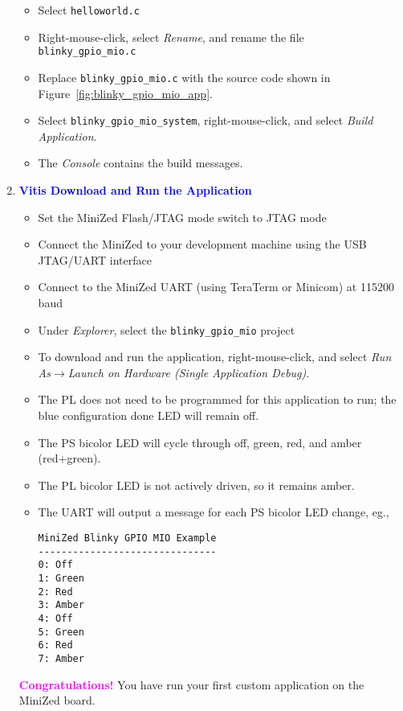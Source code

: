 \begin{enumerate}
\begin{itemize}
\item Select \texttt{helloworld.c}
\item Right-mouse-click, select \emph{Rename}, and rename the file \texttt{blinky\_gpio\_mio.c}
\item Replace \texttt{blinky\_gpio\_mio.c} with the source code shown in
Figure~\ref{fig:blinky_gpio_mio_app}.
\item Select \texttt{blinky\_gpio\_mio\_system}, right-mouse-click, and
select \emph{Build Application}.
\item The \emph{Console} contains the build messages.
\end{itemize}
%
\item \textcolor{blue}{\textbf{Vitis Download and Run the Application}}
%
\begin{itemize}
\item Set the MiniZed Flash/JTAG mode switch to JTAG mode
\item Connect the MiniZed to your development machine using the USB JTAG/UART interface
\item Connect to the MiniZed UART (using TeraTerm or Minicom) at 115200 baud
\item Under \emph{Explorer}, select the \texttt{blinky\_gpio\_mio}
project
\item To download and run the application, right-mouse-click, and 
select \emph{Run As}$\rightarrow$\emph{Launch on Hardware 
(Single Application Debug)}.
\item The PL does not need to be programmed for this application to run;
the blue configuration done LED will remain off.
\item The PS bicolor LED will cycle through off, green, red, and amber (red+green).
\item The PL bicolor LED is not actively driven, so it remains amber.
\item The UART will output a message for each PS bicolor LED change, eg.,
\begin{verbatim}
MiniZed Blinky GPIO MIO Example
-------------------------------
0: Off
1: Green
2: Red
3: Amber
4: Off
5: Green
6: Red
7: Amber
\end{verbatim}
\end{itemize}

\textcolor{magenta}{\bf Congratulations!} You have run your first custom application on the MiniZed board.


\end{enumerate}

